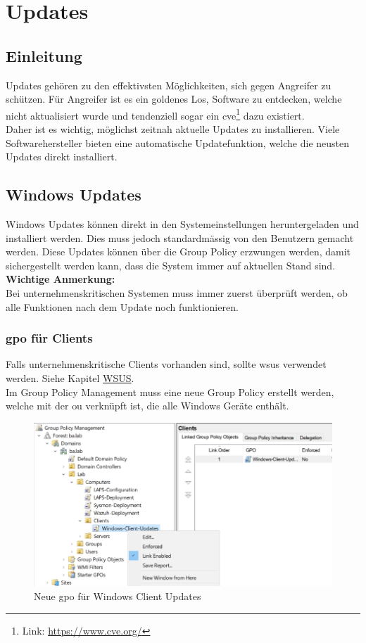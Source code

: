 \chapter{Updates}
\section{Einleitung}
Updates gehören zu den effektivsten Möglichkeiten, sich gegen Angreifer zu schützen.
Für Angreifer ist es ein goldenes Los, Software zu entdecken, welche nicht aktualisiert wurde und tendenziell sogar ein \acrfull{cve}\footnote{Link: \href{https://www.cve.org/}{https://www.cve.org/}} dazu existiert.\\

Daher ist es wichtig, möglichst zeitnah aktuelle Updates zu installieren.
Viele Softwarehersteller bieten eine automatische Updatefunktion, welche die neusten Updates direkt installiert.

\section{Windows Updates}
Windows Updates können direkt in den Systemeinstellungen heruntergeladen und installiert werden.
Dies muss jedoch standardmässig von den Benutzern gemacht werden.
Diese Updates können über die Group Policy erzwungen werden, damit sichergestellt werden kann, dass die System immer auf aktuellen Stand sind.\\

\textbf{Wichtige Anmerkung:}\\
Bei unternehmenskritischen Systemen muss immer zuerst überprüft werden, ob alle Funktionen nach dem Update noch funktionieren.


\subsection{\acrshort{gpo} für Clients}
Falls unternehmenskritische Clients vorhanden sind, sollte \acrfull{wsus} verwendet werden. Siehe Kapitel \hyperref[subsec:wsus]{WSUS}.\\

Im Group Policy Management muss eine neue Group Policy erstellt werden, welche mit der \acrshort{ou} verknüpft ist, die alle Windows Geräte enthält.
\begin{figure}[H]
    \centering
    \includegraphics[width=\linewidth]{../img/Updates/edit-gpo-clinets.png}
    \caption{Neue \acrshort{gpo} für Windows Client Updates}
\end{figure}

